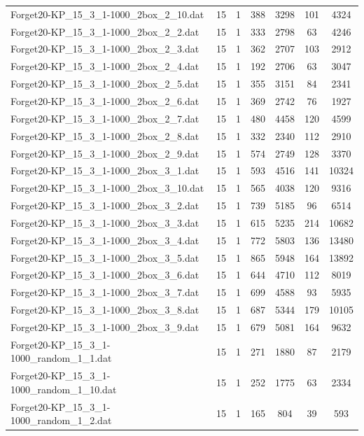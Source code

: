 \begin{table}[!ht]
\begin{tabular}{lcccccc}
Forget20-KP\_15\_3\_1-1000\_2box\_2\_10.dat & 15 & 1 & 388 & 3298 & 101 & 4324 \\
Forget20-KP\_15\_3\_1-1000\_2box\_2\_2.dat & 15 & 1 & 333 & 2798 & 63 & 4246 \\
Forget20-KP\_15\_3\_1-1000\_2box\_2\_3.dat & 15 & 1 & 362 & 2707 & 103 & 2912 \\
Forget20-KP\_15\_3\_1-1000\_2box\_2\_4.dat & 15 & 1 & 192 & 2706 & 63 & 3047 \\
Forget20-KP\_15\_3\_1-1000\_2box\_2\_5.dat & 15 & 1 & 355 & 3151 & 84 & 2341 \\
Forget20-KP\_15\_3\_1-1000\_2box\_2\_6.dat & 15 & 1 & 369 & 2742 & 76 & 1927 \\
Forget20-KP\_15\_3\_1-1000\_2box\_2\_7.dat & 15 & 1 & 480 & 4458 & 120 & 4599 \\
Forget20-KP\_15\_3\_1-1000\_2box\_2\_8.dat & 15 & 1 & 332 & 2340 & 112 & 2910 \\
Forget20-KP\_15\_3\_1-1000\_2box\_2\_9.dat & 15 & 1 & 574 & 2749 & 128 & 3370 \\
Forget20-KP\_15\_3\_1-1000\_2box\_3\_1.dat & 15 & 1 & 593 & 4516 & 141 & 10324 \\
Forget20-KP\_15\_3\_1-1000\_2box\_3\_10.dat & 15 & 1 & 565 & 4038 & 120 & 9316 \\
Forget20-KP\_15\_3\_1-1000\_2box\_3\_2.dat & 15 & 1 & 739 & 5185 & 96 & 6514 \\
Forget20-KP\_15\_3\_1-1000\_2box\_3\_3.dat & 15 & 1 & 615 & 5235 & 214 & 10682 \\
Forget20-KP\_15\_3\_1-1000\_2box\_3\_4.dat & 15 & 1 & 772 & 5803 & 136 & 13480 \\
Forget20-KP\_15\_3\_1-1000\_2box\_3\_5.dat & 15 & 1 & 865 & 5948 & 164 & 13892 \\
Forget20-KP\_15\_3\_1-1000\_2box\_3\_6.dat & 15 & 1 & 644 & 4710 & 112 & 8019 \\
Forget20-KP\_15\_3\_1-1000\_2box\_3\_7.dat & 15 & 1 & 699 & 4588 & 93 & 5935 \\
Forget20-KP\_15\_3\_1-1000\_2box\_3\_8.dat & 15 & 1 & 687 & 5344 & 179 & 10105 \\
Forget20-KP\_15\_3\_1-1000\_2box\_3\_9.dat & 15 & 1 & 679 & 5081 & 164 & 9632 \\
Forget20-KP\_15\_3\_1-1000\_random\_1\_1.dat & 15 & 1 & 271 & 1880 & 87 & 2179 \\
Forget20-KP\_15\_3\_1-1000\_random\_1\_10.dat & 15 & 1 & 252 & 1775 & 63 & 2334 \\
Forget20-KP\_15\_3\_1-1000\_random\_1\_2.dat & 15 & 1 & 165 & 804 & 39 & 593 \\

\end{tabular}
\end{table}
